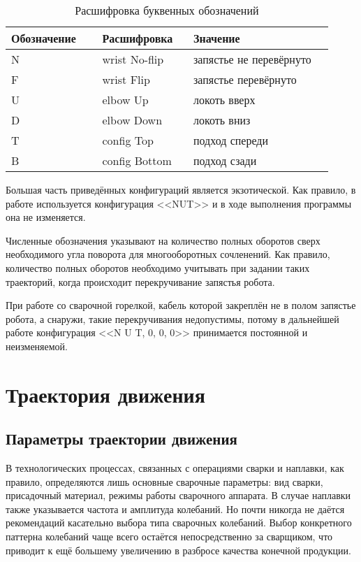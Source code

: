 \begin{table}[H]
    \caption{Расшифровка буквенных обозначений}
    \label{tab:RobotConfig}
    \begin{tabular}{|p{0.26\linewidth}|p{0.26\linewidth}|p{0.4\linewidth}|}
        \hline
        Обозначение & Расшифровка   & Значение                \\ \hline
        N           & wrist No-flip & запястье не перевёрнуто \\ \hline
        F           & wrist Flip    & запястье перевёрнуто    \\ \hline
        U           & elbow Up      & локоть вверх            \\ \hline
        D           & elbow Down    & локоть вниз             \\ \hline
        T           & config Top    & подход спереди          \\ \hline
        B           & config Bottom & подход сзади            \\ \hline
    \end{tabular}
\end{table}

Большая часть приведённых конфигураций является экзотической.
Как правило, в работе используется конфигурация <<NUT>> и в ходе выполнения программы она не изменяется.

Численные обозначения указывают на количество полных оборотов сверх необходимого угла поворота для многооборотных сочленений.
Как правило, количество полных оборотов необходимо учитывать при задании таких траекторий, когда происходит перекручивание запястья робота.

При работе со сварочной горелкой, кабель которой закреплён не в полом запястье робота, а снаружи, такие перекручивания недопустимы, потому в дальнейшей работе конфигурация <<N U T, 0, 0, 0>> принимается постоянной и неизменяемой.


\section{Траектория движения}

\subsection{Параметры траектории движения} \label{subsec:TrajectoryParameters}
В технологических процессах, связанных с операциями сварки и наплавки, как правило, определяются лишь основные сварочные параметры: вид сварки, присадочный материал, режимы работы сварочного аппарата.
В случае наплавки также указывается частота и амплитуда колебаний.
Но почти никогда не даётся рекомендаций касательно выбора типа сварочных колебаний.
Выбор конкретного паттерна колебаний чаще всего остаётся непосредственно за сварщиком, что приводит к ещё большему увеличению в разбросе качества конечной продукции.

